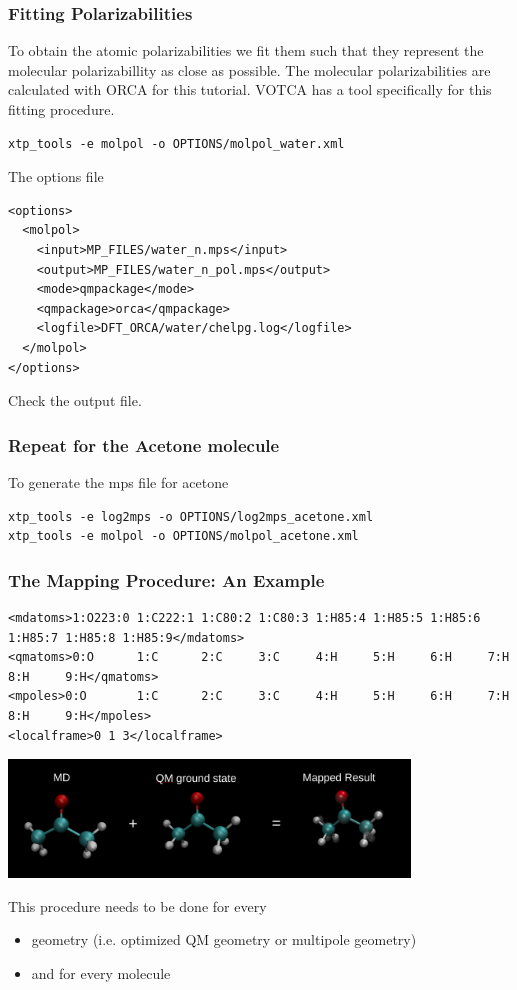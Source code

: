 \documentclass[t,aspectratio=169, 8pt]{beamer}
\begin{document}
\begin{frame}[fragile]
  \frametitle{Fitting Polarizabilities}  
  To obtain the atomic polarizabilities we fit them such that they represent the
  molecular polarizabillity as close as possible. The molecular polarizabilities
  are calculated with ORCA for this tutorial. VOTCA has a tool specifically for
  this fitting procedure.
  \begin{verbatim}
xtp_tools -e molpol -o OPTIONS/molpol_water.xml
  \end{verbatim}
  The options file
  \begin{verbatim}
<options>
  <molpol>
    <input>MP_FILES/water_n.mps</input>
    <output>MP_FILES/water_n_pol.mps</output>
    <mode>qmpackage</mode>
    <qmpackage>orca</qmpackage>
    <logfile>DFT_ORCA/water/chelpg.log</logfile>
  </molpol>
</options>
  \end{verbatim}
  Check the output file.
\end{frame}

\begin{frame}[fragile]
  \frametitle{Repeat for the Acetone molecule}  
  To generate the mps file for acetone
  \begin{verbatim}
xtp_tools -e log2mps -o OPTIONS/log2mps_acetone.xml
xtp_tools -e molpol -o OPTIONS/molpol_acetone.xml
  \end{verbatim}

\end{frame}


\begin{frame}[fragile]
  \frametitle{The Mapping Procedure: An Example}  
  \begin{verbatim}
<mdatoms>1:O223:0 1:C222:1 1:C80:2 1:C80:3 1:H85:4 1:H85:5 1:H85:6 1:H85:7 1:H85:8 1:H85:9</mdatoms>
<qmatoms>0:O      1:C      2:C     3:C     4:H     5:H     6:H     7:H     8:H     9:H</qmatoms>
<mpoles>0:O       1:C      2:C     3:C     4:H     5:H     6:H     7:H     8:H     9:H</mpoles>
<localframe>0 1 3</localframe>
  \end{verbatim}

  \begin{center}
  \includegraphics[width=0.8\textwidth]{images/mdAndqm/mapping}
  \end{center}

  \small This procedure needs to be done for every
  \begin{itemize}
    \item geometry (i.e. optimized QM geometry or multipole geometry)
    \item and for every molecule
  \end{itemize}
\end{frame}
\end{document}

